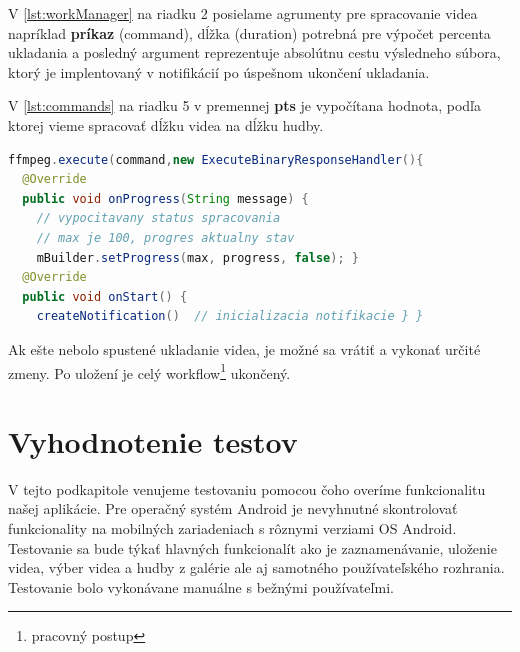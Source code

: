 \documentclass[12pt, oneside]{book}
\begin{document}
\begin{figure}[H]

\end{figure}

V \autoref{lst:workManager} na riadku 2 posielame agrumenty pre spracovanie videa napríklad \textbf{príkaz} (command), dĺžka (duration) potrebná pre výpočet percenta ukladania a posledný argument reprezentuje absolútnu cestu výsledneho súbora, ktorý je implentovaný v notifikácií po úspešnom ukončení ukladania.



V \autoref{lst:commands} na riadku 5 v premennej \textbf{pts} je vypočítana hodnota, podľa ktorej vieme spracovať dĺžku videa na dĺžku hudby.

\begin{lstlisting}[language=Java, caption=Príklad spustenia vykonávania príkazu a jeho príslušné metódy pomocou knižnice FFmpeg.]
ffmpeg.execute(command,new ExecuteBinaryResponseHandler(){
  @Override
  public void onProgress(String message) {
    // vypocitavany status spracovania
    // max je 100, progres aktualny stav
    mBuilder.setProgress(max, progress, false); }
  @Override
  public void onStart() {
    createNotification()  // inicializacia notifikacie } }
\end{lstlisting}

Ak ešte nebolo spustené ukladanie videa, je možné sa vrátiť a vykonať určité zmeny. Po uložení je celý workflow\footnote{pracovný postup} ukončený.


\section{Vyhodnotenie testov}

\hspace{15pt} V tejto podkapitole venujeme testovaniu pomocou čoho overíme funkcionalitu našej aplikácie. Pre operačný systém Android je nevyhnutné skontrolovať funkcionality na mobilných zariadeniach s rôznymi verziami OS Android. Testovanie sa bude týkať hlavných funkcionalít ako je zaznamenávanie, uloženie videa, výber videa a hudby z galérie ale aj samotného používateľského rozhrania. Testovanie bolo vykonávane manuálne s bežnými používateľmi.
\end{document}
